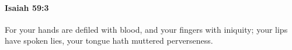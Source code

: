 
		\paragraph{Isaiah 59:3} %
			\label{ISAIAH-59-3}

			For your hands are defiled with blood, and your fingers with iniquity; your lips have spoken lies, your tongue hath muttered perverseness.


